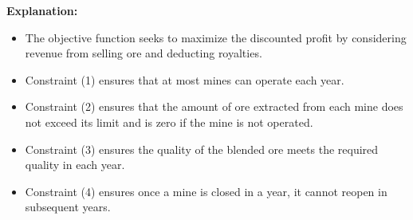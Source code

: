 \documentclass{article}
\begin{document}
\textbf{Explanation:}
\begin{itemize}
    \item The objective function seeks to maximize the discounted profit by considering revenue from selling ore and deducting royalties.
    \item Constraint (1) ensures that at most  mines can operate each year.
    \item Constraint (2) ensures that the amount of ore extracted from each mine does not exceed its limit and is zero if the mine is not operated.
    \item Constraint (3) ensures the quality of the blended ore meets the required quality in each year.
    \item Constraint (4) ensures once a mine is closed in a year, it cannot reopen in subsequent years.
\end{itemize}
\end{document}
